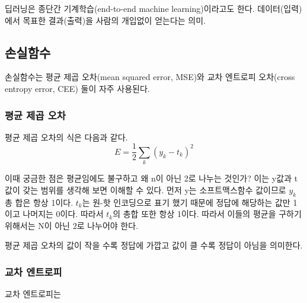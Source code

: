 \documentclass[12pt]{article}
\begin{document}
딥러닝은 종단간 기계학습(end-to-end machine learning)이라고도 한다. 데이터(입력)에서 목표한 결과(출력)을 사람의 개입없이 얻는다는 의미.

\subsection{손실함수}

손실함수는 평균 제곱 오차(mean squared error, MSE)와 교차 엔트로피 오차(cross entropy error, CEE) 둘이 자주 사용된다.
\subsubsection{평균 제곱 오차}
평균 제곱 오차의 식은 다음과 같다.
\[ E = \frac{1}{2} \sum_{k}(y_{k} - t_{k})^2  \]

이때 궁금한 점은 평균임에도 불구하고 왜 n이 아닌 2로 나누는 것인가? 이는 y값과 t값이 갖는 범위를 생각해 보면 이해할 수 있다. 먼저 y는 소프트맥스함수 값이므로 $y_{k}$ 총 합은 항상 1이다.
$t_{k}$는 원-핫 인코딩으로 표기 했기 때문에 정답에 해당하는 값만 1이고 나머지는 0이다. 따라서 $t_{k}$의 총합 또한 항상 1이다. 따라서 이들의 평균을 구하기 위해서는 N이 아닌 2로 나누어야 한다.

평균 제곱 오차의 값이 작을 수록 정답에 가깝고 값이 클 수록 정답이 아님을 의미한다.
\subsubsection{교차 엔트로피}
교차 엔트로피는 
\end{document}
